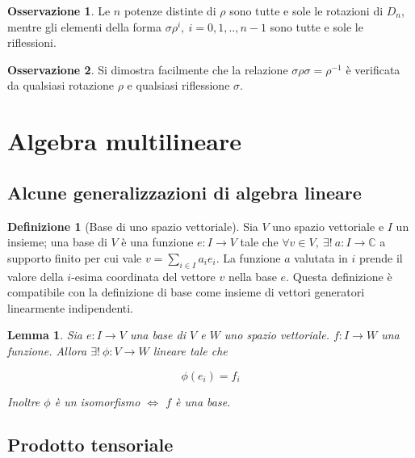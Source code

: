 \documentclass[11pt]{article}
\theoremstyle{plain}
\newtheorem{lemma}[thm]{Lemma}
\theoremstyle{definition}
\newtheorem{defn}{Definizione}[section]
\newtheorem*{rem}{Osservazione}
\theoremstyle{remark}
\begin{document}
\begin{rem}
 Le $n$ potenze distinte di $\rho$ sono tutte e sole le rotazioni di $D_n$, mentre gli elementi della forma $\sigma\rho^{i},\ i=0,1,..,n-1$ 
 sono tutte e sole le riflessioni. 
\end{rem}

\begin{rem}
 Si dimostra facilmente che la relazione $\sigma\rho\sigma=\rho^{-1}$ è verificata da qualsiasi rotazione $\rho$
 e qualsiasi riflessione $\sigma$.
\end{rem}







\newpage
\section{Algebra multilineare}
\subsection{Alcune generalizzazioni di algebra lineare}

\begin{defn}[Base di uno spazio vettoriale]
Sia $V$ uno spazio vettoriale e $I$ un insieme; una base di $V$ è una funzione $e: I \to V$ tale che 
$\forall v \in V,\  \exists!\  a: I \to \mathbb{C}$ a supporto finito per cui vale $v=\sum_{i\in I}a_i e_i$. La funzione $a$ 
valutata in $i$ prende il valore della $i$-esima coordinata del vettore $v$ nella base $e$. Questa definizione è compatibile con la 
definizione di base come insieme di vettori generatori linearmente indipendenti.
\end{defn}


\begin{lemma}
 Sia $e:I\to V$ una base di $V$ e $W$ uno spazio vettoriale. $f: I \to W$ una funzione. Allora $\exists!\  \phi: V \to W$ lineare tale che

\[\phi(e_i) = f_i \]

Inoltre $\phi$ è un isomorfismo $\Leftrightarrow$ $f$ è una base.
\end{lemma}


\subsection{Prodotto tensoriale}


  
\end{document}
